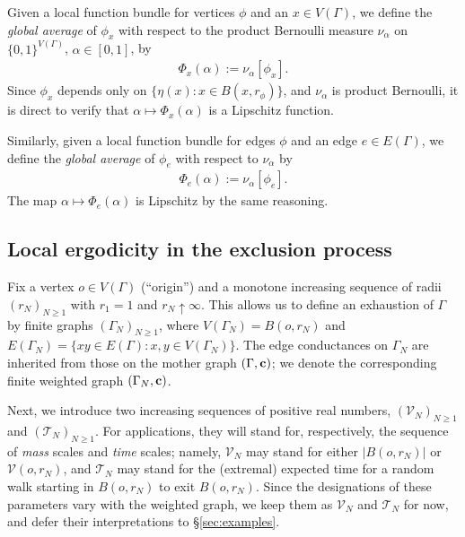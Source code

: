 \documentclass[11pt]{amsart}
\theoremstyle{plain}
\theoremstyle{definition}
\theoremstyle{remark}
\newcommand{\pt}{\mathsf{p}}
\begin{document}
Given a local function bundle for vertices $\phi$ and an $x\in V(\Gamma)$, we define the \emph{global average} of $\phi_x$ with respect to the product Bernoulli measure $\nu_\alpha$ on $\{0,1\}^{V(\Gamma)}$, $\alpha\in [0,1]$, by
\begin{align}
\Phi_x(\alpha) := \nu_\alpha[\phi_x].
 \end{align}
Since $\phi_x$ depends only on $\{\eta(x): x\in B(x,r_\phi)\}$, and $\nu_\alpha$ is product Bernoulli, it is direct to verify that $\alpha\mapsto \Phi_x(\alpha)$ is a Lipschitz function. 

Similarly, given a local function bundle for edges $\phi$ and an edge $e\in E(\Gamma)$, we define the \emph{global average} of $\phi_e$ with respect to $\nu_\alpha$ by
\begin{align}
\Phi_e(\alpha) := \nu_\alpha[\phi_e].
\end{align}
The map $\alpha \mapsto \Phi_e(\alpha)$ is Lipschitz by the same reasoning.


\subsection{Local ergodicity in the exclusion process} \label{sec:superexp}

Fix a vertex $o\in V(\Gamma)$ (``origin'') and a monotone increasing sequence of radii $(r_N)_{N\geq 1}$ with $r_1=1$ and $r_N \uparrow \infty$. This allows us to define an exhaustion of $\Gamma$ by finite graphs $(\Gamma_N)_{N\geq 1}$, where $V(\Gamma_N)= B(o,r_N)$ and $E(\Gamma_N) = \{xy\in E(\Gamma): x, y \in V(\Gamma_N)\}$. The edge conductances on $\Gamma_N$ are inherited from those on the mother graph $(\Gamma, {\bf c})$; we denote the corresponding finite weighted graph $(\Gamma_N, {\bf c})$.

Next, we introduce two increasing sequences of positive real numbers, $(\mathcal{V}_N)_{N\geq 1}$ and $(\mathcal{T}_N)_{N\geq 1}$. For applications, they will stand for, respectively, the sequence of \emph{mass} scales and \emph{time} scales; namely, $\mathcal{V}_N$ may stand for either $|B(o,r_N)|$ or $\mathcal{V}(o,r_N)$, and $\mathcal{T}_N$ may stand for the (extremal) expected time for a random walk starting in $B(o,r_N)$
to exit $B(o,r_N)$. Since the designations of these parameters vary with the weighted graph, we keep them as $\mathcal{V}_N$ and $\mathcal{T}_N$ for now, and defer their interpretations to \S\ref{sec:examples}. 
\end{document}
